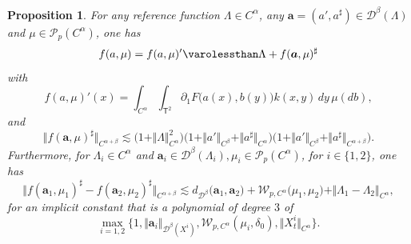 \documentclass[10pt]{amsart}
\newtheorem{prop}[thm]{Proposition}
\theoremstyle{definition}
\newcommand{\mcD}{\mathcal{D}}
\newcommand{\mcP}{\mathcal{P}}
\newcommand\mcW{\mathcal W}
\newcommand{\bsa}{\boldsymbol{a}}
\newcommand{\norme}[1]{\Vert #1 \Vert}
\begin{document}
\begin{prop} \label{paralinearisation0}
For any reference function $\Lambda\in C^\alpha$, any $\bsa=(a',a^\sharp)\in \mcD^{\beta}(\Lambda)$ and $\mu\in \mcP_p(C^\alpha)$, one has
\[
f(a,\mu) = f(a, \mu)' \varolessthan \Lambda + f(\bsa, \mu)^\sharp
\]
with
\[
f(a,\mu)'(x) = \int_{C^\alpha}\int_{\mathsf{T}^2}\partial_1F\bigl(a(x), b(y)\bigr) k(x,y) \, dy \, \mu(db),
\]
and
\[
\norme{f(\bsa, \mu)^\sharp}_{C^{\alpha+\beta}} \lesssim \bigl(1+\norme{\Lambda}^2_{C^\alpha}\bigr) \bigl(1+\norme{a'}_{C^\beta} + \norme{a^\sharp}_{C^\alpha} \bigr) \bigl(1+ \norme{a'}_{C^\beta} + \Vert a^\sharp\Vert_{C^{\alpha+\beta}} \bigr).
\]
Furthermore, for $\Lambda_i\in C^\alpha$ and $\bsa_i\in \mcD^\beta(\Lambda_i), \mu_i\in\mcP_p(C^\alpha)$, for $i\in\{1,2\}$, one has
\begin{equation} \label{EqLipscthizEstimateFUNu1}
\big\Vert f(\bsa_1,\mu_1)^\sharp - f(\bsa_2,\mu_2)^\sharp\big\Vert_{C^{\alpha+\beta}} \lesssim d_{\mcD^\beta}\bigl(\bsa_1, \bsa_2\bigr) + \mcW_{p,C^\alpha}\bigl(\mu_1, \mu_2\bigr) + \Vert \Lambda_1 - \Lambda_2\Vert_{C^\alpha},
\end{equation}
for an implicit constant that is a polynomial of degree $3$ of
\[
\max_{i=1,2}\bigl\{ 1, \Vert \bsa_i\Vert_{\mcD^\beta(X^i)}, \mcW_{p,C^\alpha}(\mu_i,\delta_0), \Vert X_t^i\Vert_{C^\alpha} \bigr\}.
\]
\end{prop}
\end{document}
